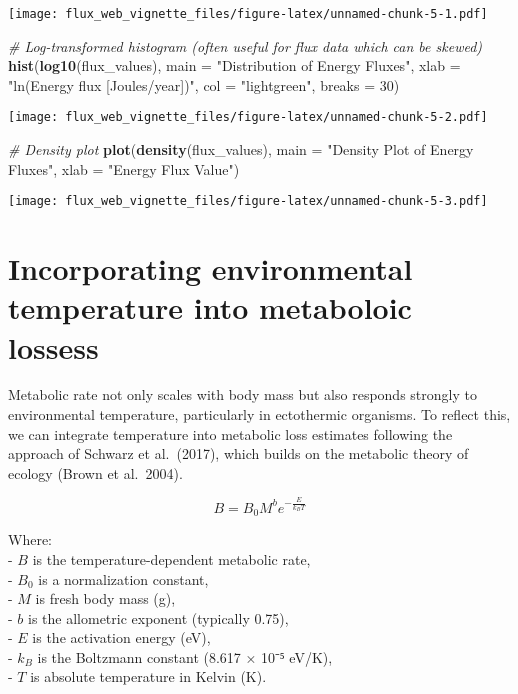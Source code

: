\documentclass[
]{article}
\newenvironment{Shaded}{\begin{snugshade}}{\end{snugshade}}
\newcommand{\AttributeTok}[1]{\textcolor[rgb]{0.13,0.29,0.53}{#1}}
\newcommand{\CommentTok}[1]{\textcolor[rgb]{0.56,0.35,0.01}{\textit{#1}}}
\newcommand{\DecValTok}[1]{\textcolor[rgb]{0.00,0.00,0.81}{#1}}
\newcommand{\FunctionTok}[1]{\textcolor[rgb]{0.13,0.29,0.53}{\textbf{#1}}}
\newcommand{\NormalTok}[1]{#1}
\newcommand{\StringTok}[1]{\textcolor[rgb]{0.31,0.60,0.02}{#1}}
\begin{document}
\texttt{[image: flux\_web\_vignette\_files/figure-latex/unnamed-chunk-5-1.pdf]}

\begin{Shaded}
\begin{Highlighting}[]
\CommentTok{\# Log{-}transformed histogram (often useful for flux data which can be skewed)}
\FunctionTok{hist}\NormalTok{(}\FunctionTok{log10}\NormalTok{(flux\_values), }
     \AttributeTok{main =} \StringTok{"Distribution of Energy Fluxes"}\NormalTok{, }
     \AttributeTok{xlab =} \StringTok{"ln(Energy flux [Joules/year])"}\NormalTok{,}
     \AttributeTok{col =} \StringTok{"lightgreen"}\NormalTok{,}
     \AttributeTok{breaks =} \DecValTok{30}\NormalTok{)}
\end{Highlighting}
\end{Shaded}

\texttt{[image: flux\_web\_vignette\_files/figure-latex/unnamed-chunk-5-2.pdf]}

\begin{Shaded}
\begin{Highlighting}[]
\CommentTok{\# Density plot}
\FunctionTok{plot}\NormalTok{(}\FunctionTok{density}\NormalTok{(flux\_values), }
     \AttributeTok{main =} \StringTok{"Density Plot of Energy Fluxes"}\NormalTok{,}
     \AttributeTok{xlab =} \StringTok{"Energy Flux Value"}\NormalTok{)}
\end{Highlighting}
\end{Shaded}

\texttt{[image: flux\_web\_vignette\_files/figure-latex/unnamed-chunk-5-3.pdf]}

\section{Incorporating environmental temperature into metaboloic
lossess}\label{incorporating-environmental-temperature-into-metaboloic-lossess}

Metabolic rate not only scales with body mass but also responds strongly
to environmental temperature, particularly in ectothermic organisms. To
reflect this, we can integrate temperature into metabolic loss estimates
following the approach of Schwarz et al.~(2017), which builds on the
metabolic theory of ecology (Brown et al.~2004).

\[
B = B_0 M^b e^{-\frac{E}{k_B T}}
\]

Where:\\
- \(B\) is the temperature-dependent metabolic rate,\\
- \(B_0\) is a normalization constant,\\
- \(M\) is fresh body mass (g),\\
- \(b\) is the allometric exponent (typically 0.75),\\
- \(E\) is the activation energy (eV),\\
- \(k_B\) is the Boltzmann constant (8.617 × 10⁻⁵ eV/K),\\
- \(T\) is absolute temperature in Kelvin (K).
\end{document}

